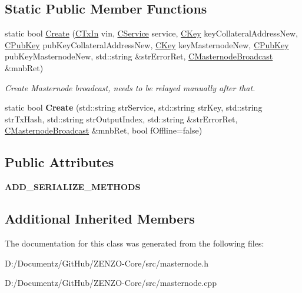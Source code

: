 \subsection*{Static Public Member Functions}
\begin{DoxyCompactItemize}
\item 
\mbox{\label{class_c_masternode_broadcast_a3b331bac6aa4ab8ece112b62243f7498}} 
static bool \mbox{\hyperlink{class_c_masternode_broadcast_a3b331bac6aa4ab8ece112b62243f7498}{Create}} (\mbox{\hyperlink{class_c_tx_in}{C\+Tx\+In}} vin, \mbox{\hyperlink{class_c_service}{C\+Service}} service, \mbox{\hyperlink{class_c_key}{C\+Key}} key\+Collateral\+Address\+New, \mbox{\hyperlink{class_c_pub_key}{C\+Pub\+Key}} pub\+Key\+Collateral\+Address\+New, \mbox{\hyperlink{class_c_key}{C\+Key}} key\+Masternode\+New, \mbox{\hyperlink{class_c_pub_key}{C\+Pub\+Key}} pub\+Key\+Masternode\+New, std\+::string \&str\+Error\+Ret, \mbox{\hyperlink{class_c_masternode_broadcast}{C\+Masternode\+Broadcast}} \&mnb\+Ret)
\begin{DoxyCompactList}\small\item\em Create Masternode broadcast, needs to be relayed manually after that. \end{DoxyCompactList}\item 
\mbox{\label{class_c_masternode_broadcast_a5b999adcbdb1de059cb226f3367771b0}} 
static bool {\bfseries Create} (std\+::string str\+Service, std\+::string str\+Key, std\+::string str\+Tx\+Hash, std\+::string str\+Output\+Index, std\+::string \&str\+Error\+Ret, \mbox{\hyperlink{class_c_masternode_broadcast}{C\+Masternode\+Broadcast}} \&mnb\+Ret, bool f\+Offline=false)
\end{DoxyCompactItemize}
\subsection*{Public Attributes}
\begin{DoxyCompactItemize}
\item 
\mbox{\label{class_c_masternode_broadcast_a3b423bd09c06dbb8b75dc06d3d34a4b0}} 
{\bfseries A\+D\+D\+\_\+\+S\+E\+R\+I\+A\+L\+I\+Z\+E\+\_\+\+M\+E\+T\+H\+O\+DS}
\end{DoxyCompactItemize}
\subsection*{Additional Inherited Members}


The documentation for this class was generated from the following files\+:\begin{DoxyCompactItemize}
\item 
D\+:/\+Documentz/\+Git\+Hub/\+Z\+E\+N\+Z\+O-\/\+Core/src/masternode.\+h\item 
D\+:/\+Documentz/\+Git\+Hub/\+Z\+E\+N\+Z\+O-\/\+Core/src/masternode.\+cpp\end{DoxyCompactItemize}
